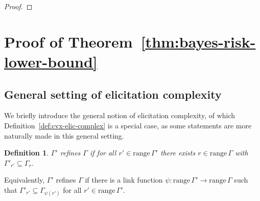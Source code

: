 \documentclass[11pt]{article} %
\newcommand{\reals}{\mathbb{R}}
\newcommand{\simplex}{\Delta_\Y}
\newcommand{\range}{\mathrm{range}\,}
\newcommand{\Sc}{\mathcal{S}}  %
\newcommand{\Y}{\mathcal{Y}}
\newtheorem{definition}{Definition}
\begin{document}
\begin{proof}
\end{proof}

\section{Proof of Theorem~\ref{thm:bayes-risk-lower-bound}}\label{app:pf-bayesrisklowerbound}

\newcommand{\EL}{\mathcal{E}}
\newcommand{\defeq}{:=}
\newcommand{\conv}{\mathrm{conv}}

\subsection{General setting of elicitation complexity}

We briefly introduce the general notion of elicitation complexity, of which Definition~\ref{def:cvx-elic-complex} is a special case, as some statements are more naturally made in this general setting.

\begin{definition}
  \label{def:refine}
  $\Gamma'$ \emph{refines} $\Gamma$ if for all $r'\in\range\Gamma'$ there exists $r\in\range\Gamma$ with $\Gamma'_{r'} \subseteq \Gamma_r$.
\end{definition}
Equivalently, $\Gamma'$ refines $\Gamma$ if there is a link function $\psi:\range\Gamma'\to\range\Gamma$ such that $\Gamma'_{r'} \subseteq \Gamma_{\psi(r')}$ for all $r'\in\range\Gamma'$.
\end{document}
